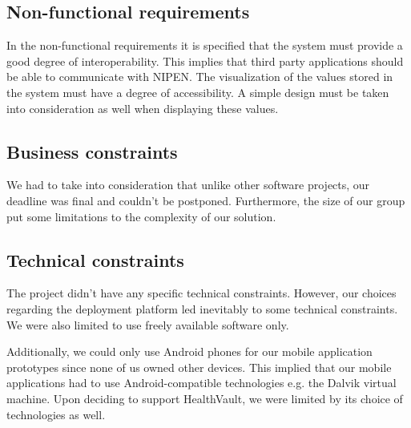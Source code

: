 \subsection{Non-functional requirements}

In the non-functional requirements it is specified that the system must provide a good degree of interoperability.
This implies that third party applications should be able to communicate with NIPEN.
The visualization of the values stored in the system must have a degree of accessibility.
A simple design must be taken into consideration as well when displaying these values.

\subsection{Business constraints}
\label{subsec:business-constraints}

We had to take into consideration that unlike other software projects, our deadline was final
and couldn't be postponed. Furthermore, the size of our group put some limitations
to the complexity of our solution.

\subsection{Technical constraints}

The project didn't have any specific technical constraints.
However, our choices regarding the deployment platform led inevitably to some technical
constraints. We were also limited to use freely available software only.


Additionally, we could only use Android phones for our mobile application prototypes
since none of us owned other devices. This implied that our mobile applications
had to use Android-compatible technologies e.g. the Dalvik virtual machine.
Upon deciding to support HealthVault, we were limited by its choice of
technologies as well.
\fi

